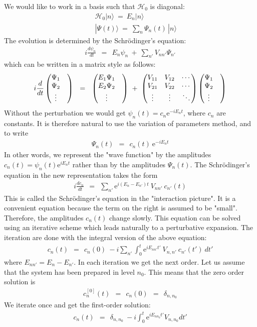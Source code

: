 \documentclass[onecolumn,fleqn, 11pt]{revtex4}
\newcommand{\eexp}{\mathrm{e}^}
\newcommand{\amatrix}[1]{\begin{matrix} #1 \end{matrix}}
\newcommand{\beq}{\begin{eqnarray}}
\newcommand{\eeq}{\end{eqnarray}}
\begin{document}
We would like to work in a basis 
such that ${\mathcal{H}_0}$ is diagonal:
\beq
&& \mathcal{H}_0 |n \rangle \ = \  E_n |n \rangle
\\ \nonumber
&& |\Psi(t)\rangle \ = \ \sum_{n}\Psi_n(t) \, |n\rangle 
\eeq
The evolution is determined by the Schr\"{o}dinger's equation:
\beq
i\frac{d\psi_n}{dt} \ \ = \ \ E_n\psi_n \ + \ \sum_{n'} V_{nn'} \Psi_{n' }
\eeq
which can be written in a matrix style as follows:
\beq
i\frac{d}{dt} \left(\amatrix{ \Psi_1& \cr \Psi_2 \cr \vdots } \right)
\ \ = \ \ 
\left(\amatrix{ E_1\Psi_1& \cr E_2 \Psi_2 \cr \vdots } \right)
\ + \  
\left(
\amatrix{
V_{11} & V_{12} & \cdots \cr 
V_{21} & V_{22} & \cdots \cr 
\vdots & \vdots &\ddots } 
\right) 
\left(\amatrix{ \Psi_1& \cr \Psi_2 \cr \vdots } \right) 
\eeq
Without the perturbation we would 
get ${\psi_n(t)= c_n \eexp{-iE_n t}}$, 
where ${c_n}$ are constants.  
It is therefore natural to use 
the variation of parameters method, 
and to write 
\beq
\Psi_n(t) \ \ = \ \ c_n(t) \ \eexp{-iE_n t} 
\eeq
In other words, we represent the "wave function" 
by the amplitudes ${ c_n(t) = \psi_n(t) \eexp{iE_n t}}$ 
rather than by the amplitudes $\Psi_n(t)$. 
The Schr\"{o}dinger's equation in the new 
representation takes the form  
\beq
i\frac{d c_n}{dt} \ \ = \ \ \sum_{n'} \eexp{i(E_{n}-E_{n'})t} \ V_{nn'} \ c_{n'}(t) 
\eeq
This is called the Schr\"{o}dinger's equation 
in the "interaction picture". It is a convenient 
equation because the term on the right 
is assumed to be "small". Therefore, the amplitudes ${c_n(t)}$ change 
slowly. This equation can be solved using 
an iterative scheme which leads naturally 
to a perturbative expansion. The iteration are done 
with  the integral version of the above equation:
\beq
c_n(t)\ \ = \ \  c_n(0) \ - i \sum_{n'} \int_0^{t} 
\eexp{i E_{nn'} t'} \ V_{n,n'} \ c_{n'}(t') \ dt' 
\eeq
where ${ E_{nn'} = E_n-E_{n'} }$. In each iteration we get 
the next order. Let us assume that the system has 
been prepared in level $n_0$. This means that the zero 
order solution is 
\beq
c_n^{[0]}(t) \ \  = \ \  c_{n}(0) \ \ =\ \  \delta_{n,n_0 } 
\eeq
We iterate once and get the first-order solution:
\beq
c_n(t) \ \ = \ \ \delta_{n,n_0} \ - i\int_0^t \eexp{iE_{nn_0} t'} V_{n,n_0} dt'
\eeq
\end{document}
